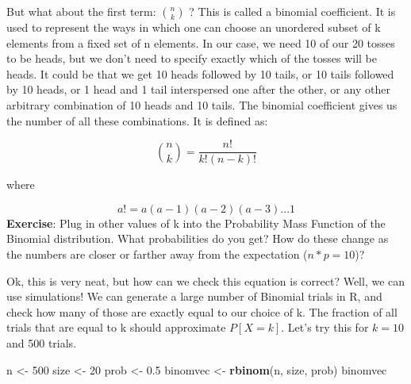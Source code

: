 \documentclass[
]{book}
\newenvironment{Shaded}{\begin{snugshade}}{\end{snugshade}}
\newcommand{\DecValTok}[1]{\textcolor[rgb]{0.00,0.00,0.81}{#1}}
\newcommand{\FloatTok}[1]{\textcolor[rgb]{0.00,0.00,0.81}{#1}}
\newcommand{\KeywordTok}[1]{\textcolor[rgb]{0.13,0.29,0.53}{\textbf{#1}}}
\newcommand{\NormalTok}[1]{#1}
\newcommand{\StringTok}[1]{\textcolor[rgb]{0.31,0.60,0.02}{#1}}
\begin{document}
But what about the first term: \(n \choose k\) ? This is called a binomial coefficient. It is used to represent the ways in which one can choose an unordered subset of k elements from a fixed set of n elements. In our case, we need 10 of our 20 tosses to be heads, but we don't need to specify exactly which of the tosses will be heads. It could be that we get 10 heads followed by 10 tails, or 10 tails followed by 10 heads, or 1 head and 1 tail interspersed one after the other, or any other arbitrary combination of 10 heads and 10 tails. The binomial coefficient gives us the number of all these combinations. It is defined as:

\[{n \choose k} = \frac{n!}{k!(n-k)!}\]

where

\[a! = a(a-1)(a-2)(a-3) ...1\]
\textbf{Exercise}: Plug in other values of k into the Probability Mass Function of the Binomial distribution. What probabilities do you get? How do these change as the numbers are closer or farther away from the expectation (\(n*p=10\))?

Ok, this is very neat, but how can we check this equation is correct? Well, we can use simulations! We can generate a large number of Binomial trials in R, and check how many of those are exactly equal to our choice of k. The fraction of all trials that are equal to k should approximate \(P[X=k]\). Let's try this for \(k=10\) and 500 trials.

\begin{Shaded}
\begin{Highlighting}[]
\NormalTok{n \textless{}{-}}\StringTok{ }\DecValTok{500}
\NormalTok{size \textless{}{-}}\StringTok{ }\DecValTok{20}
\NormalTok{prob \textless{}{-}}\StringTok{ }\FloatTok{0.5}
\NormalTok{binomvec \textless{}{-}}\StringTok{ }\KeywordTok{rbinom}\NormalTok{(n, size, prob)}
\NormalTok{binomvec}
\end{Highlighting}
\end{Shaded}
\end{document}
